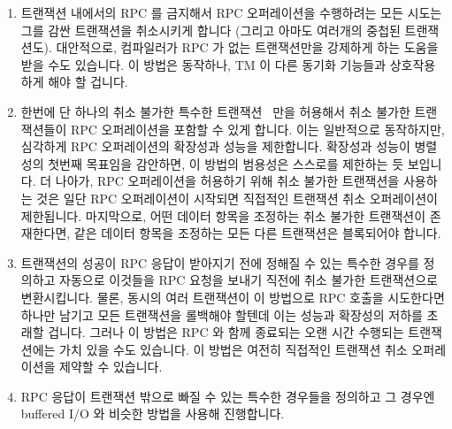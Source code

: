 \begin{enumerate}
\item	트랜잭션 내에서의 RPC 를 금지해서 RPC 오퍼레이션을 수행하려는 모든
	시도는 그를 감싼 트랜잭션을 취소시키게 합니다 (그리고 아마도 여러개의
	중첩된 트랜잭션도).
	대안적으로, 컴파일러가 RPC 가 없는 트랜잭션만을 강제하게 하는 도움을
	받을 수도 있습니다.
	이 방법은 동작하나, TM 이 다른 동기화 기능들과 상호작용하게 해야 할
	겁니다.
\item	한번에 단 하나의 취소 불가한 특수한
	트랜잭션~\cite{SpearMichaelScott2008InevitableSTM} 만을 허용해서 취소
	불가한 트랜잭션들이 RPC 오퍼레이션을 포함할 수 있게 합니다.
	이는 일반적으로 동작하지만, 심각하게 RPC 오퍼레이션의 확장성과 성능을
	제한합니다.
	확장성과 성능이 병렬성의 첫번째 목표임을 감안하면, 이 방법의 범용성은
	스스로를 제한하는 듯 보입니다.
	더 나아가, RPC 오퍼레이션을 허용하기 위해 취소 불가한 트랜잭션을
	사용하는 것은 일단 RPC 오퍼레이션이 시작되면 직접적인 트랜잭션 취소
	오퍼레이션이 제한됩니다.
	마지막으로, 어떤 데이터 항목을 조정하는 취소 불가한 트랜잭션이
	존재한다면, 같은 데이터 항목을 조정하는 모든 다른 트랜잭션은 블록되어야
	합니다.

\item	트랜잭션의 성공이 RPC 응답이 받아지기 전에 정해질 수 있는 특수한 경우를
	정의하고 자동으로 이것들을 RPC 요청을 보내기 직전에 취소 불가한
	트랜잭션으로 변환시킵니다.
	물론, 동시의 여러 트랜잭션이 이 방법으로 RPC 호출을 시도한다면 하나만
	남기고 모든 트랜잭션을 롤백해야 할텐데 이는 성능과 확장성의 저하를
	초래할 겁니다.
	그러나 이 방법은 RPC 와 함께 종료되는 오랜 시간 수행되는 트랜잭션에는
	가치 있을 수도 있습니다.
	이 방법은 여전히 직접적인 트랜잭션 취소 오퍼레이션을 제약할 수
	있습니다.
\item	RPC 응답이 트랜잭션 밖으로 빠질 수 있는 특수한 경우들을 정의하고 그
	경우엔 buffered I/O 와 비슷한 방법을 사용해 진행합니다.


\end{enumerate}
